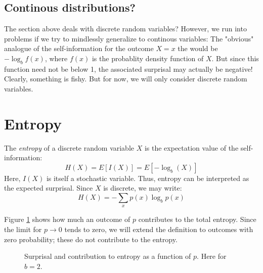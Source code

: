 \documentclass[12pt, a4paper]{article}
\numberwithin{equation}{section}
\begin{document}
\subsection{Continous distributions?}
The section above deals with discrete random variables? However, we run into problems if we try to mindlessly generalize to continous variables: The "obvious" analogue of the self-information for the outcome $X=x$ the would be $-\log_b f(x)$, where $f(x)$ is the probablity density function of $X$. But since this function need not be below 1, the associated surprisal may actually be negative! Clearly, something is fishy. But for now, we will only consider discrete random variables.

\section{Entropy}
The \textit{entropy} of a discrete random variable $X$ is the expectation value of the self-information:
\begin{equation}
H(X)=E[I(X)]=E[-\log_b(X)]
\end{equation}
Here, $I(X)$ is itself a stochastic variable. Thus, entropy can be interpreted as the expected surprisal. Since $X$ is discrete, we may write:
\begin{equation}
H(X)=-\sum_x p(x)\log_b p(x)
\end{equation}

Figure \ref{fig:entropy_graph} shows how much an outcome of $p$ contributes to the total entropy. Since the limit for $p\rightarrow 0$ tends to zero, we will extend the definition to outcomes with zero probability; these do not contribute to the entropy.

\begin{figure}
\centering
{}
\caption{Surprisal and contribution to entropy as a function of $p$. Here for $b=2$.}
\label{fig:entropy_graph}
\end{figure}
\end{document}
